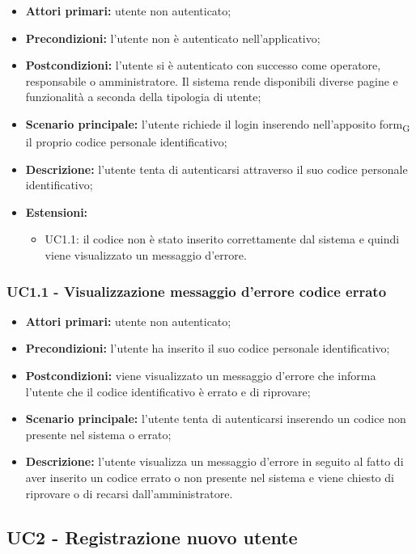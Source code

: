 \begin{itemize}
	\item 	\textbf{Attori primari:} utente non autenticato;
	\item 	\textbf{Precondizioni:} l'utente non è autenticato nell'applicativo;
	\item 	\textbf{Postcondizioni:}	l'utente si è autenticato con successo come operatore, responsabile o amministratore. Il sistema rende disponibili diverse pagine e funzionalità a seconda della tipologia di utente;
	\item 	\textbf{Scenario principale:} l'utente richiede il login inserendo nell'apposito \gls{form}\textsubscript{G} il proprio codice personale identificativo;
	\item 	\textbf{Descrizione:} l'utente tenta di autenticarsi attraverso il suo codice personale identificativo;
	\item 	\textbf{Estensioni:} 
		\begin{itemize}
			\item UC1.1: il codice non è stato inserito correttamente dal sistema e quindi viene visualizzato un messaggio d'errore.
		\end{itemize}
\end{itemize}
\subsubsection{UC1.1 - Visualizzazione messaggio d'errore codice errato}

\begin{itemize}
	\item 	\textbf{Attori primari:} utente non autenticato;
	\item 	\textbf{Precondizioni:} l'utente ha inserito il suo codice personale identificativo;
	\item 	\textbf{Postcondizioni:} viene visualizzato un messaggio d'errore che informa l'utente che il codice identificativo è errato e di riprovare;
	\item 	\textbf{Scenario principale:} l'utente tenta di autenticarsi inserendo un codice non presente nel sistema o errato;
	\item 	\textbf{Descrizione:} l'utente visualizza un messaggio d'errore in seguito al fatto di aver inserito un codice errato o non presente nel sistema e viene chiesto di riprovare o di recarsi dall'amministratore.
	
\end{itemize}

\subsection{UC2 - Registrazione nuovo utente}


